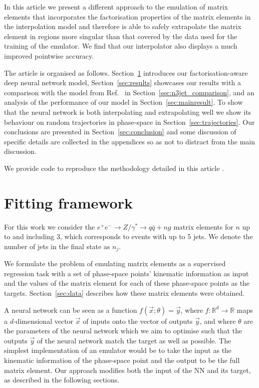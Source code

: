 \documentclass[main.tex]{subfiles}
\begin{document}
In this article we present a different approach to the emulation of matrix elements that incorporates the factorisation 
properties of the matrix elements in the interpolation model and therefore is able to safely 
extrapolate the matrix element in regions more singular than that covered by the data used for the training of the emulator. We find
that our interpolator also displays a much improved pointwise accuracy.

The article is organised as follows. 
Section~\ref{sec:fitting} introduces our factorisation-aware 
deep neural network model, Section~\ref{sec:results} showcases our results with a comparison with the 
model from Ref.~\cite{Badger:2020uow} in Section~\ref{sec:n3jet_comparison}, and an analysis of the performance of our model in Section~\ref{sec:mainresult}. 
To show that the neural network is both interpolating and extrapolating well we show its 
behaviour on random trajectories in phase-space in Section~\ref{sec:trajectories}. 
Our conclusions are presented in Section~\ref{sec:conclusion} 
and some discussion of specific details are collected in the appendices so as not to distract from the main discussion.

We provide code to reproduce the methodology detailed in this article \cite{fame_repo}.

\section{Fitting framework}\label{sec:fitting}
For this work we consider the $e^+e^-\rightarrow Z / \gamma^{*} \rightarrow q\bar q +n g$ matrix elements for $n$ up to and including 3, 
which corresponds to events with up to 5 jets. We denote the number of jets in the final state as $n_{j}$.

We formulate the problem of emulating matrix elements as a supervised regression task with a set of phase-space points' kinematic information as input and the 
values of the matrix element for each of these phase-space points as the targets. Section~\ref{sec:data} describes how these matrix elements were obtained.

A neural network can be seen as a function $f(\vec{x}; \theta) = \vec{y}$, where $f: \mathbb{R}^{d} \rightarrow \mathbb{R}$ maps a 
$d$-dimensional vector $\vec{x}$ of inputs onto the vector of outputs $\vec{y}$, and where $\theta$ are the parameters of the neural network which we aim to optimise 
such that the outputs $\vec{y}$ of the neural network match the target as well as possible. 
The simplest implementation of an emulator would be to take the input as the kinematic information of the phase-space point and the output to be the full matrix element. 
Our approach modifies both the input of the NN and its target, as described in the following sections.
\end{document}
